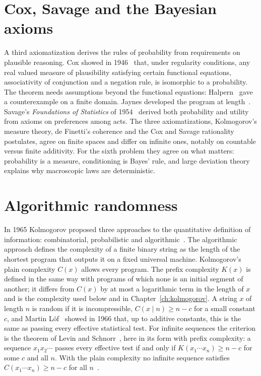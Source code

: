 \section{Cox, Savage and the Bayesian axioms}

A third axiomatization derives the rules of probability from requirements on plausible reasoning. Cox showed in 1946~\cite{cox1946} that, under regularity conditions, any real valued measure of plausibility satisfying certain functional equations, associativity of conjunction and a negation rule, is isomorphic to a probability. The theorem needs assumptions beyond the functional equations: Halpern~\cite{halpern1999} gave a counterexample on a finite domain. Jaynes developed the program at length~\cite{jaynes2003}. Savage's \emph{Foundations of Statistics} of 1954~\cite{savage1954} derived both probability and utility from axioms on preferences among acts. The three axiomatizations, Kolmogorov's measure theory, de Finetti's coherence and the Cox and Savage rationality postulates, agree on finite spaces and differ on infinite ones, notably on countable versus finite additivity. For the sixth problem they agree on what matters: probability is a measure, conditioning is Bayes' rule, and large deviation theory explains why macroscopic laws are deterministic.

\section{Algorithmic randomness}

In 1965 Kolmogorov proposed three approaches to the quantitative definition of information: combinatorial, probabilistic and algorithmic~\cite{kolmogorov1965}. The algorithmic approach defines the complexity of a finite binary string as the length of the shortest program that outputs it on a fixed universal machine. Kolmogorov's plain complexity $C(x)$ allows every program. The prefix complexity $K(x)$ is defined in the same way with programs of which none is an initial segment of another; it differs from $C(x)$ by at most a logarithmic term in the length of $x$ and is the complexity used below and in Chapter~\ref{ch:kolmogorov}. A string $x$ of length $n$ is random if it is incompressible, $C(x\mid n)\geq n-c$ for a small constant $c$, and Martin L\"of~\cite{martinlof1966} showed in 1966 that, up to additive constants, this is the same as passing every effective statistical test. For infinite sequences the criterion is the theorem of Levin and Schnorr~\cite{levin1973,schnorr1973}, here in its form with prefix complexity: a sequence $x_1x_2\cdots$ passes every effective test if and only if $K(x_1\cdots x_n)\geq n-c$ for some $c$ and all $n$. With the plain complexity no infinite sequence satisfies $C(x_1\cdots x_n)\geq n-c$ for all $n$~\cite{martinlof1971}.

